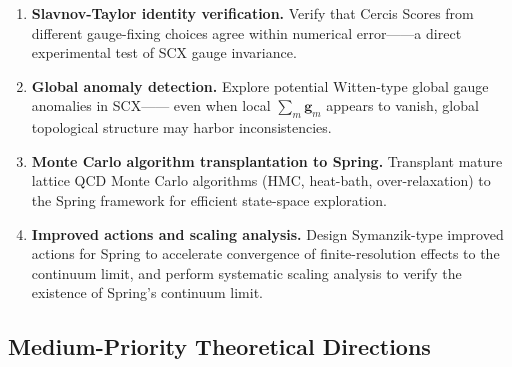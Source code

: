 \documentclass[12pt,a4paper]{article}
\theoremstyle{remark}
\newcommand{\gaugeparam}{\mathbf{g}}
\begin{document}
\begin{enumerate}[label=\textbf{Priority \arabic*:}]
    \item \textbf{Slavnov-Taylor identity verification.}
    Verify that Cercis Scores from different gauge-fixing choices
    agree within numerical error——a direct experimental test of SCX
    gauge invariance.\\[2pt]

    \item \textbf{Global anomaly detection.}
    Explore potential Witten-type global gauge anomalies in SCX——
    even when local $\sum_m \gaugeparam_m$ appears to vanish,
    global topological structure may harbor inconsistencies.\\[2pt]

    \item \textbf{Monte Carlo algorithm transplantation to Spring.}
    Transplant mature lattice QCD Monte Carlo algorithms (HMC, heat-bath, over-relaxation)
    to the Spring framework for efficient state-space exploration.\\[2pt]

    \item \textbf{Improved actions and scaling analysis.}
    Design Symanzik-type improved actions for Spring to accelerate
    convergence of finite-resolution effects to the continuum limit, and perform systematic scaling analysis
    to verify the existence of Spring's continuum limit.\\[2pt]
\end{enumerate}

\subsection{Medium-Priority Theoretical Directions}
\end{document}
